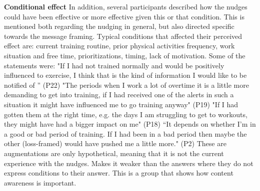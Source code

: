 \textbf{Conditional effect}
In addition, several participants described how the nudges could have been effective or more effective given this or that condition. This is mentioned both regarding the nudging in general, but also directed specific towards the message framing. Typical conditions that affected their perceived effect are: current training routine, prior physical activities frequency, work situation and free time, prioritizations, timing, lack of motivation. Some of the statements were: 
"If I had not trained normally and would be positively influenced to exercise, I think that is the kind of information I would like to be notified of ” (P22)
"The periods when I work a lot of overtime it is a little more demanding to get into training, if I had received one of the alerts in such a situation it might have influenced me to go  training anyway" (P19)
"If I had gotten them at the right time, e.g. the days I am struggling to get to workouts, they might have had a bigger impact on me" (P18)
“It depends on whether I'm in a good or bad period of training. If I had been in a bad period then maybe the other (loss-framed) would have pushed me a little more." (P2)
These are augmentations are only hypothetical, meaning that it is not the current experience with the nudges. Makes it weaker than the answers where they do not express conditions to their answer. This is a group that shows how content awareness is important.















